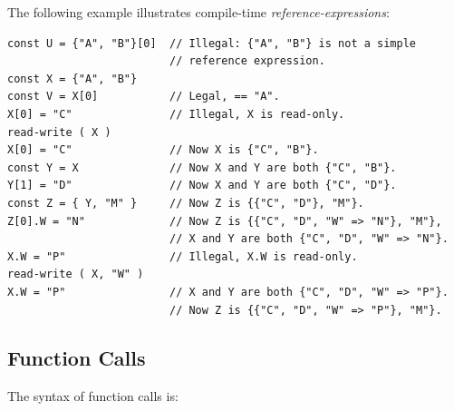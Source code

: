 \documentclass[12pt]{article}
\newenvironment{indpar}[1][0.3in]%
	{\begin{list}{}%
		     {\setlength{\itemsep}{0in}%
		      \setlength{\topsep}{0in}%
		      \setlength{\parsep}{1ex}%
		      \setlength{\labelwidth}{#1}%
		      \setlength{\leftmargin}{#1}%
		      \addtolength{\leftmargin}{\labelsep}}%
	 \item}%
	{\end{list}}
\begin{document}
The following example illustrates compile-time {\em reference-expressions}:
\begin{indpar}\begin{verbatim}
const U = {"A", "B"}[0]  // Illegal: {"A", "B"} is not a simple
                         // reference expression.
const X = {"A", "B"}
const V = X[0]           // Legal, == "A".
X[0] = "C"               // Illegal, X is read-only.
read-write ( X )
X[0] = "C"               // Now X is {"C", "B"}.
const Y = X              // Now X and Y are both {"C", "B"}.
Y[1] = "D"               // Now X and Y are both {"C", "D"}.
const Z = { Y, "M" }     // Now Z is {{"C", "D"}, "M"}.
Z[0].W = "N"             // Now Z is {{"C", "D", "W" => "N"}, "M"},
                         // X and Y are both {"C", "D", "W" => "N"}.
X.W = "P"                // Illegal, X.W is read-only.
read-write ( X, "W" )
X.W = "P"                // X and Y are both {"C", "D", "W" => "P"}.
                         // Now Z is {{"C", "D", "W" => "P"}, "M"}.
\end{verbatim}\end{indpar}

\subsection{Function Calls}
\label{FUNCTION-CALLS}

The syntax of function calls is:
\end{document}
